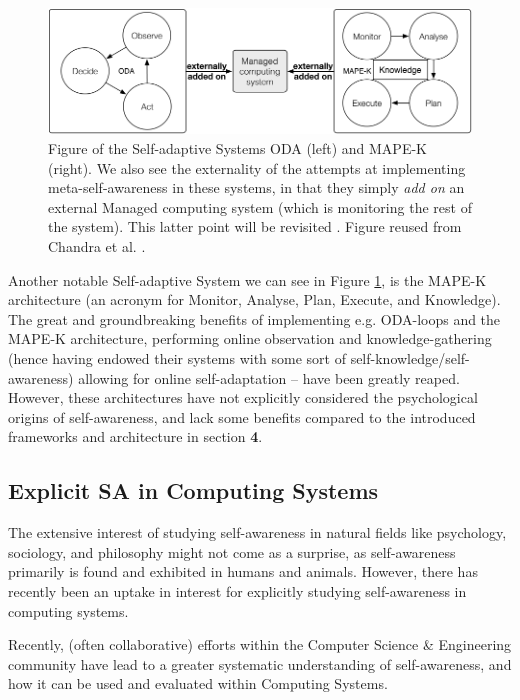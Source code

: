 	\begin{figure}[ht]
	\centering
	\includegraphics[width=\columnwidth]{Assets/DocSegments/Chapters/Background/Figures/Schema/oda_mapek.PNG}
	\caption{Figure of the Self-adaptive Systems ODA (left) and MAPE-K (right). We also see the externality of the attempts at implementing meta-self-awareness in these systems, in that they simply \textit{add on} an external Managed computing system (which is monitoring the rest of the system). This latter point will be revisited . Figure reused from Chandra et al. \cite{sacs16_ch4}.}
	\label{fig:oda_mapek}
	\end{figure}

	Another notable Self-adaptive System we can see in Figure \ref{fig:oda_mapek}, is the MAPE-K architecture (an acronym for Monitor, Analyse, Plan, Execute, and Knowledge). The great and groundbreaking benefits of implementing e.g. ODA-loops and the MAPE-K architecture, performing online observation and knowledge-gathering (hence having endowed their systems with some sort of self-knowledge/self-awareness) allowing for online self-adaptation -- have been greatly reaped. However, these architectures have not explicitly considered the psychological origins of self-awareness, and lack some benefits compared to the introduced frameworks and architecture in section \textbf{4}.


	\subsection{Explicit SA in Computing Systems}
	The extensive interest of studying self-awareness in natural fields like psychology, sociology, and philosophy might not come as a surprise, as self-awareness primarily is found and exhibited in humans and animals. However, there has recently been an uptake in interest for explicitly studying self-awareness in computing systems.

	Recently, (often collaborative) efforts within the Computer Science \& Engineering community \cite{sacs16_ch2, sacs17_ch1, sacs17_ch3} have lead to a greater systematic understanding of self-awareness, and how it can be used and evaluated within Computing Systems.

